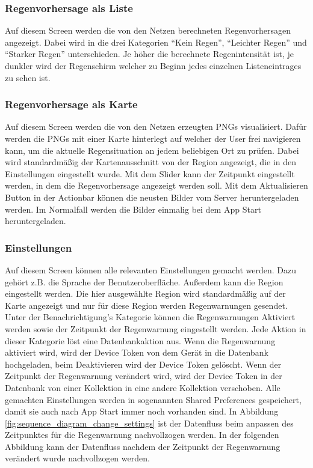 \subsubsection*{Regenvorhersage als Liste}
Auf diesem Screen werden die von den Netzen berechneten Regenvorhersagen angezeigt. 
Dabei wird in die drei Kategorien “Kein Regen”, “Leichter Regen” und “Starker Regen” unterschieden. 
Je höher die berechnete Regenintensität ist, je dunkler wird der Regenschirm welcher zu Beginn jedes einzelnen Listeneintrages zu sehen ist.   

\subsubsection*{Regenvorhersage als Karte}
Auf diesem Screen werden die von den Netzen erzeugten PNGs visualisiert. 
Dafür werden die PNGs mit einer Karte hinterlegt auf welcher der User frei navigieren kann, 
um die aktuelle Regensituation an jedem beliebigen Ort zu prüfen. 
Dabei wird standardmäßig der Kartenausschnitt von der Region angezeigt, die in den Einstellungen eingestellt wurde. 
Mit dem Slider kann der Zeitpunkt eingestellt werden, in dem die Regenvorhersage angezeigt werden soll. 
Mit dem Aktualisieren Button in der Actionbar können die neusten Bilder vom Server heruntergeladen werden. 
Im Normalfall werden die Bilder einmalig bei dem App Start heruntergeladen.  

\subsubsection*{Einstellungen}
Auf diesem Screen können alle relevanten Einstellungen gemacht werden. Dazu gehört z.B. die Sprache der Benutzeroberfläche. 
Außerdem kann die Region eingestellt werden. 
Die hier ausgewählte Region wird standardmäßig auf der Karte angezeigt und nur für diese Region werden Regenwarnungen gesendet. 
Unter der Benachrichtigung’s Kategorie können die Regenwarnungen Aktiviert werden sowie der Zeitpunkt der Regenwarnung eingestellt werden. 
Jede Aktion in dieser Kategorie löst eine Datenbankaktion aus. 
Wenn die Regenwarnung aktiviert wird, wird der Device Token von dem Gerät in die Datenbank hochgeladen, beim Deaktivieren wird der Device Token gelöscht. 
Wenn der Zeitpunkt der Regenwarnung verändert wird, wird der Device Token in der Datenbank von einer Kollektion in eine andere Kollektion verschoben.   
Alle gemachten Einstellungen werden in sogenannten Shared Preferences gespeichert, damit sie auch nach App Start immer noch vorhanden sind.   
In Abbildung \ref*{fig:sequence_diagram_change_settings} ist der Datenfluss beim anpassen des Zeitpunktes für die Regenwarnung 
nachvollzogen werden. 
In der folgenden Abbildung kann der Datenfluss nachdem der Zeitpunkt der Regenwarnung verändert wurde nachvollzogen werden.

